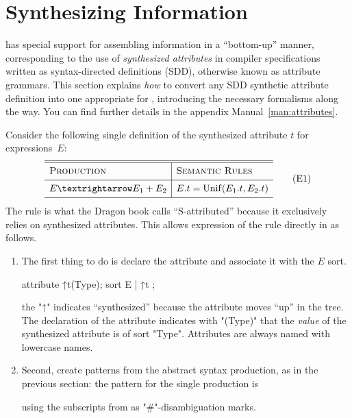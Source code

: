 \documentclass[11pt]{article} %
\begin{document}
\section{Synthesizing Information}
\label{sec:collect}

\HAX has special support for assembling information in a ``bottom-up'' manner, corresponding to the
use of \emph{synthesized attributes} in compiler specifications written as syntax-directed
definitions (SDD), otherwise known as attribute grammars. This section explains \emph{how} to
convert any SDD synthetic attribute definition into one appropriate for \HAX, introducing the
necessary \HAX formalisms along the way.  You can find further details in the appendix
Manual~\ref{man:attributes}.

\begin{example}
  Consider the following single definition of the synthesized attribute $t$ for expressions~$E$:
  \begin{equation}
    \begin{array}{l|l}
      \hline
      \hline
      \textsc{Production}  & \textsc{Semantic Rules} \Bigstrut\\
      \hline
      E → E_1 + E_2 & E.t = \op{Unif}(E_1.t, E_2.t) \Bigstrut\\
      \hline
    \end{array}
    \tag{E1}
  \end{equation}
  The rule is what the Dragon book calls ``S-attributed'' because it exclusively relies on
  synthesized attributes. This allows expression of the rule directly in \HAX as follows.
  \begin{enumerate}

  \item The first thing to do is declare the attribute and associate it with the $E$ sort.
    \begin{hacs}
   attribute ↑t(Type);
   sort E | ↑t ;
    \end{hacs}
    the "↑" indicates ``synthesized'' because the attribute moves ``up'' in the tree. The
    declaration of the attribute indicates with "(Type)" that the \emph{value} of the synthesized
    attribute is of sort "Type".  Attributes are always named with lowercase names.
  
  \item Second, create patterns from the abstract syntax production, as in the previous section: the
    pattern for the single production is
    using the subscripts from  as "#"-disambiguation marks.


\end{enumerate}
\end{example}
\end{document}

